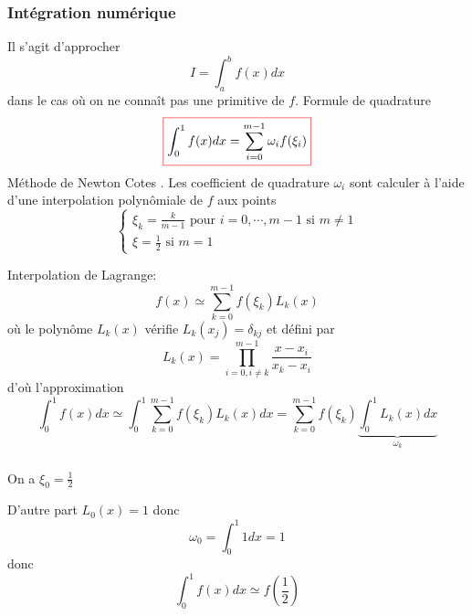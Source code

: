 \documentclass{beamer}
\newcommand{\myredbox}[1]{\fcolorbox{red}{white}{$\displaystyle#1$}}
\begin{document}
\begin{frame}
 \frametitle{Intégration numérique}
 Il s'agit d'approcher 
 \[ I =\int_a^b f(x) dx\]
dans le cas où on ne connaît pas une primitive de $f$.
Formule de quadrature
\[\myredbox{ \int_0^1 f(x) dx =\sum_{i=0}^{m-1}\omega_i f(\xi_i)}\]
Méthode de Newton Cotes . Les coefficient de quadrature $\omega_i$ sont calculer à l'aide d'une interpolation polynômiale de $f$ aux points 
\[\left\{\begin{array}{l}
\xi_k=\frac{k}{m-1}\mbox{ pour }i=0,\cdots, m-1\mbox{ si }m\neq 1\\
\xi=\frac{1}{2}\mbox{ si }m = 1
\end{array}\right.
\]
\end{frame}

\begin{frame}
Interpolation de Lagrange:
\[ f(x) \simeq \sum_{k=0}^{m-1}f(\xi_k)L_k(x)\]
où le polynôme $L_k(x)$ vérifie  $L_k(x_j)=\delta_{kj}$ et défini par
 \[L_k(x)=\prod_{i=0, i\neq k}^{m-1}\frac{x-x_i}{x_k-x_i}\]
d'où l'approximation
\[ \int_0^1 f(x)dx \simeq \int_0^1 \sum_{k=0}^{m-1}f(\xi_k) L_k(x)dx = \sum_{k=0}^{m-1}f(\xi_k)\underbrace{\int_0^1 L_k(x)dx}_{\omega_k}\]


 


\end{frame}

\begin{frame}
 \frametitle{  }
 On a $\xi_0=\frac 12$ 
 
 D'autre part $L_0(x)=1$ donc \[\omega_0=\int_0^1 1 dx=1\]
  donc
\[\boxed{\int_0^1 f(x)dx \simeq f\left(\frac 12\right) }\]

\end{frame}
\end{document}
